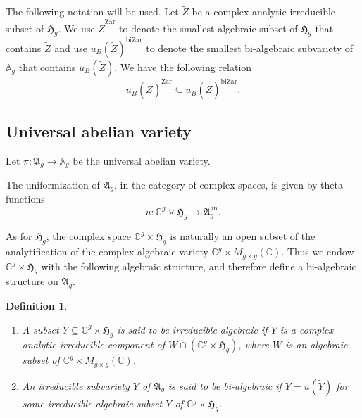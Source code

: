 \documentclass[12pt,oneside]{amsart}
\newcounter{maincounter}
\numberwithin{maincounter}{section}
\numberwithin{equation}{section}
\newtheorem{definition}[maincounter]{Definition}
\def\CC{\mathbb{C}}
\newcommand{\IC}{{\CC}}
\begin{document}
The following notation will be used. Let $\tilde{Z}$ be a complex
analytic irreducible subset of $\mathfrak{H}_g$. We use
$\tilde{Z}^{\mathrm{Zar}}$ to denote the smallest algebraic subset of
$\mathfrak{H}_g$ that contains $\tilde{Z}$
and use $u_B(\tilde{Z})^{\mathrm{biZar}}$ to denote the smallest
bi-algebraic subvariety of $\mathbb{A}_g$ that contains
$u_B(\tilde{Z})$. We have the following
relation
\begin{equation*}
u_B(\tilde{Z})^{\mathrm{Zar}} \subseteq u_B(\tilde{Z})^{\mathrm{biZar}}.
\end{equation*}




\subsection{Universal abelian variety}
Let $\pi \colon \mathfrak{A}_g \rightarrow \mathbb{A}_g$ be the universal abelian variety.

The uniformization of $\mathfrak{A}_g$, in the category of complex
spaces, is given by theta functions
\begin{equation}\label{EqUnifUniversalAbVar}
u \colon \IC^g \times  \mathfrak{H}_g \rightarrow \mathfrak{A}_g^{\mathrm{an}}.
\end{equation}

As for $\mathfrak{H}_g$, the complex space $\IC^g \times  \mathfrak{H}_g$ is naturally an open subset of the analytification of the complex algebraic variety $\IC^g \times M_{g \times g}(\mathbb{C})$. Thus we endow $\IC^g \times  \mathfrak{H}_g$ with the following algebraic structure, and therefore define a bi-algebraic structure on $\mathfrak{A}_g$.
\begin{definition}%
\begin{enumerate}
\item[(i)] A subset $\tilde{Y} \subseteq \IC^g \times  \mathfrak{H}_g$
  is said to be irreducible algebraic if $\tilde{Y}$ is a complex
  analytic irreducible component of $W \cap (\IC^g \times
  \mathfrak{H}_g)$, where $W$ is an algebraic subset of $\IC^g
  \times M_{g \times g}(\mathbb{C})$.
\item[(ii)] An irreducible subvariety $Y$ of $\mathfrak{A}_g$ is said to be bi-algebraic if $Y = u(\tilde{Y})$ for some irreducible algebraic subset $\tilde{Y}$ of $\IC^g \times  \mathfrak{H}_g$.
\end{enumerate}
\end{definition}
\end{document}
